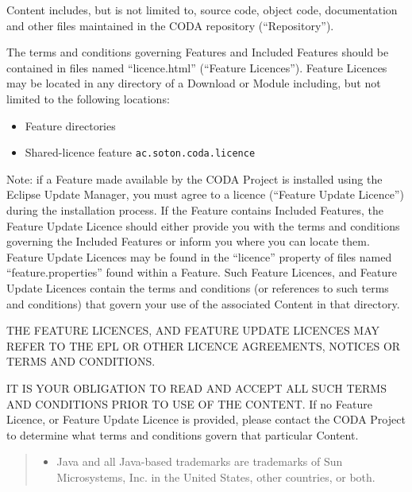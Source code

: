 Content includes, but is not limited to, source code, object code,
documentation and other files maintained in the CODA repository (``Repository'').

The terms and conditions governing Features and Included Features
should be contained in files named ``licence.html'' (``Feature
Licences'').  Feature Licences may be located in any directory of a
Download or Module including, but not limited to the following
locations:

\begin{itemize}
\item Feature directories
\item Shared-licence feature \texttt{ac.soton.coda.licence}
\end{itemize}

Note: if a Feature made available by the CODA Project is
installed using the Eclipse Update Manager, you must agree to a
licence (``Feature Update Licence'') during the installation process.
If the Feature contains Included Features, the Feature Update
Licence should either provide you with the terms and conditions
governing the Included Features or inform you where you can locate
them.  Feature Update Licences may be found in the ``licence''
property of files named ``feature.properties'' found within a
Feature.  Such Feature Licences, and Feature Update
Licences contain the terms and conditions (or references to such
terms and conditions) that govern your use of the associated
Content in that directory.

THE FEATURE LICENCES, AND FEATURE UPDATE LICENCES MAY REFER
TO THE EPL OR OTHER LICENCE AGREEMENTS, NOTICES OR TERMS AND
CONDITIONS.

IT IS YOUR OBLIGATION TO READ AND ACCEPT ALL SUCH TERMS AND
CONDITIONS PRIOR TO USE OF THE CONTENT.  If no Feature
Licence, or Feature Update Licence is provided, please contact the
CODA Project to determine what terms and conditions govern
that particular Content.
\begin{quote}
  \footnotesize

  \begin{itemize}
  \item  Java and all Java-based trademarks are trademarks of Sun
    Microsystems, Inc. in the United States, other countries, or
    both.
  \end{itemize}
\end{quote}

